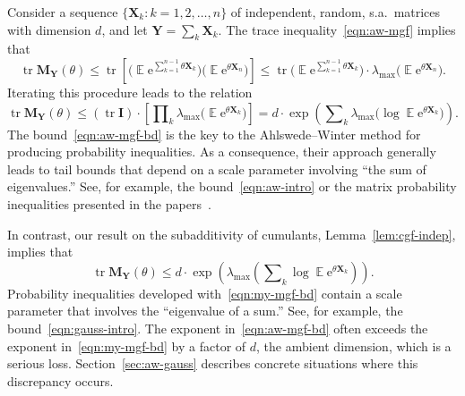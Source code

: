 \documentclass[11pt,letterpaper,twoside,reqno,draft]{amsart}
\theoremstyle{remark}
\numberwithin{equation}{section}
\numberwithin{thm}{section}
\begin{document}
Consider a sequence $\{{\bm{{X}}}_k : k = 1, 2, \dots, n \}$ of independent, random, s.a.~matrices with dimension $d$, and let ${\bm{{Y}}} = \sum\nolimits_k {\bm{{X}}}_k$.  The trace inequality~\eqref{eqn:aw-mgf} implies that
$$
{\operatorname{tr}} {\bm{{M}}}_{{\bm{{Y}}}}(\theta) \leq {\operatorname{tr}} \left[ \big({\operatorname{\mathbb{E}}} {\mathrm{e}}^{\sum_{k=1}^{n-1} \theta {\bm{{X}}}_k} \big)\big({\operatorname{\mathbb{E}}} {\mathrm{e}}^{\theta {\bm{{X}}}_n} \big) \right]
	\leq {\operatorname{tr}} \big({\operatorname{\mathbb{E}}} {\mathrm{e}}^{\sum_{k=1}^{n-1} \theta {\bm{{X}}}_k} \big) 
	\cdot \lambda_{\max}\big( {\operatorname{\mathbb{E}}} {\mathrm{e}}^{\theta {\bm{{X}}}_n} \big).
$$
Iterating this procedure leads to the relation
\begin{equation} \label{eqn:aw-mgf-bd}
{\operatorname{tr}} {\bm{{M}}}_{{\bm{{Y}}}}(\theta)
	\leq ({\operatorname{tr}} {\mathbf{I}}) \cdot \left[ \prod\nolimits_k \lambda_{\max}\big( {\operatorname{\mathbb{E}}} {\mathrm{e}}^{\theta {\bm{{X}}}_k} \big)
	\right]
	= d \cdot \exp\left(\sum\nolimits_k \lambda_{\max}\big( \log {\operatorname{\mathbb{E}}}  {\mathrm{e}}^{\theta {\bm{{X}}}_k} \big) \right).
\end{equation}
The bound~\eqref{eqn:aw-mgf-bd} is the key to the Ahlswede--Winter method for producing probability inequalities.  As a consequence, their approach generally leads to tail bounds that depend on a scale parameter involving ``the sum of eigenvalues.''  See, for example, the bound~\eqref{eqn:aw-intro} or the matrix probability inequalities presented in the papers~\cite{AW02:Strong-Converse,CM08:Expansion-Properties,Gro11:Recovering-Low-Rank,Rec09:Simpler-Approach}.

In contrast, our result on the subadditivity of cumulants, Lemma~\ref{lem:cgf-indep}, implies that
\begin{equation} \label{eqn:my-mgf-bd}
{\operatorname{tr}} {\bm{{M}}}_{{\bm{{Y}}}}(\theta)
	\leq d \cdot \exp \left(\lambda_{\max}\left( \sum\nolimits_k \log {\operatorname{\mathbb{E}}} {\mathrm{e}}^{\theta {\bm{{X}}}_k} \right) \right).
\end{equation}
Probability inequalities developed with~\eqref{eqn:my-mgf-bd} contain a scale parameter that involves the ``eigenvalue of a sum.'' See, for example, the bound~\eqref{eqn:gauss-intro}.
The exponent in~\eqref{eqn:aw-mgf-bd} often exceeds the exponent in~\eqref{eqn:my-mgf-bd} by a factor of $d$, the ambient dimension, which is a serious loss.  Section~\ref{sec:aw-gauss} describes concrete situations where this discrepancy occurs.
\end{document}
